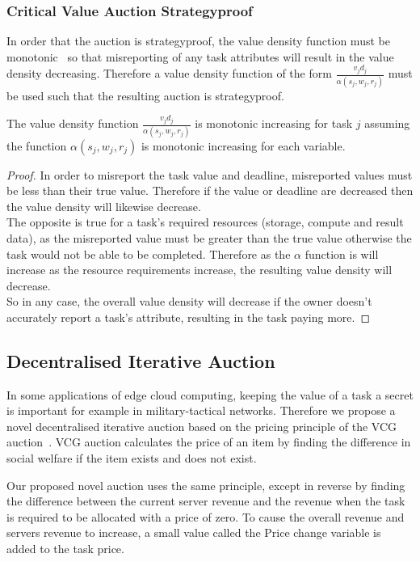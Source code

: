 \subsubsection{Critical Value Auction Strategyproof}
\label{subsubsec:critical-value-auction-strategyproof}
In order that the auction is strategyproof, the value density function must be
monotonic~\cite{nisan2007algorithmic_229_230} so that misreporting of any task attributes will result in the value
density decreasing. Therefore a value density function of the form $\frac{v_j d_j}{\alpha(s_j, w_j, r_j)}$ must be used
such that the resulting auction is strategyproof.
\begin{theorem}
    The value density function $\frac{v_j d_j}{\alpha(s_j, w_j, r_j)}$ is monotonic increasing for task $j$ assuming
    the function $\alpha(s_j, w_j, r_j)$ is monotonic increasing for each variable.
\end{theorem}
\begin{proof}
    In order to misreport the task value and deadline, misreported values must be less than their true value. Therefore
    if the value or deadline are decreased then the value density will likewise decrease. \\
    The opposite is true for a task's required resources (storage, compute and result data), as the misreported value
    must be greater than the true value otherwise the task would not be able to be completed. Therefore as the $\alpha$
    function is will increase as the resource requirements increase, the resulting value density will decrease. \\
    So in any case, the overall value density will decrease if the owner doesn't accurately report a task's attribute,
    resulting in the task paying more.
\end{proof}

\subsection{Decentralised Iterative Auction}
\label{subsec:decentralised-iterative-auction}
In some applications of edge cloud computing, keeping the value of a task a secret is important for example in
military-tactical networks. Therefore we propose a novel decentralised iterative auction based on the pricing principle
of the VCG auction~\cite{vickrey,Clarke,groves}. VCG auction calculates the price of an item by finding the
difference in social welfare if the item exists and does not exist.

Our proposed novel auction uses the same principle, except in reverse by finding the difference between the current
server revenue and the revenue when the task is required to be allocated with a price of zero. To cause the overall
revenue and servers revenue to increase, a small value called the Price change variable is added to the task price.

